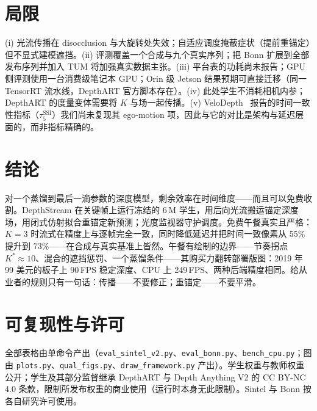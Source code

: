 \documentclass[10pt,twocolumn]{article}
\begin{document}
\section{局限}
\label{sec:limits}
(i) 光流传播在 disocclusion 与大旋转处失效；自适应调度掩蔽症状（提前重锚定）但不显式建模遮挡。(ii) 评测覆盖一个合成与九个真实序列；把 Bonn 扩展到全部发布序列并加入 TUM 将加强真实数据主张。(iii) 平台表的功耗尚未报告；GPU 侧评测使用一台消费级笔记本 GPU；Orin 级 Jetson 结果预期可直接迁移（同一 TensorRT 流水线，DepthART 官方脚本存在）。(iv) 此处学生不消耗相机内参；DepthART 的度量变体需要将 $K$ 与场一起传播。(v) VeloDepth~\cite{velodepth} 报告的时间一致性指标（$\tau^{\mathrm{SSI}}_5$）我们尚未复现其 ego-motion 项，因此与它的对比是架构与延迟层面的，而非指标精确的。

\section{结论}
对一个蒸馏到最后一滴参数的深度模型，剩余效率在时间维度——而且可以免费收割。DepthStream 在关键帧上运行冻结的 6\,M 学生，用后向光流搬运锚定深度场，用闭式仿射拟合重锚定新预测；光度监视器守护调度。免费午餐真实且严格：$K{=}3$ 时流式在精度上与逐帧完全一致，同时降低延迟并把时间一致像素从 55\% 提升到 73\%——在合成与真实基准上皆然。午餐有绘制的边界——节奏拐点 $K^*{\approx}10$、混合的遮挡惩罚、一个蒸馏条件——其购买力翻转部署版图：2019 年 99 美元的板子上 90\,FPS 稳定深度、CPU 上 249\,FPS、两种后端精度相同。给从业者的规则只有一句话：传播——不要修正；重锚定——不要平滑。

\section*{可复现性与许可}
全部表格由单命令产出（\texttt{eval\_sintel\_v2.py}、\texttt{eval\_bonn.py}、\texttt{bench\_cpu.py}；图由 \texttt{plots.py}、\texttt{qual\_figs.py}、\texttt{draw\_framework.py} 产出）。学生权重与教师权重公开；学生及其部分监督继承 DepthART 与 Depth Anything V2 的 CC BY-NC 4.0 条款，限制所发布权重的商业使用（运行时本身无此限制）。Sintel 与 Bonn 按各自研究许可使用。
\end{document}
